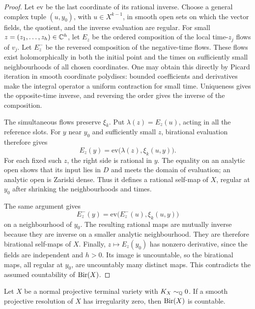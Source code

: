 \begin{proof}
Let \(\mathrm{ev}\) be the last coordinate of its rational inverse.
Choose a general complex tuple \((u,y_0)\), with
\(u\in X^{k-1}\), in smooth open sets on which the vector fields,
the quotient, and the inverse evaluation are regular.  For small
\(z=(z_1,\ldots,z_h)\in\mathbb C^h\), let \(E_z\) be the ordered
composition of the local time-\(z_j\) flows of \(v_j\).  Let
\(E_z^-\) be the reversed composition of the negative-time flows.
These flows exist holomorphically in both the initial point and the
times on sufficiently small neighbourhoods of all chosen coordinates.
One may obtain this directly by Picard iteration in smooth coordinate
polydiscs: bounded coefficients and derivatives make the integral
operator a uniform contraction for small time.  Uniqueness gives the
opposite-time inverse, and reversing the order gives the inverse of
the composition.

The simultaneous flows preserve \(\xi_k\).  Put
\(\lambda(z)=E_z(u)\), acting in all the reference slots.  For
\(y\) near \(y_0\) and sufficiently small \(z\), birational
evaluation therefore gives
\begin{equation}\label{eq:transport-flow-evaluation}
 E_z(y)=\mathrm{ev}\bigl(\lambda(z),\xi_k(u,y)\bigr).
\end{equation}
For each fixed such \(z\), the right side is rational in \(y\).
The equality on an analytic open shows that its input lies in \(D\)
and meets the domain of evaluation; an analytic open is Zariski dense.
Thus it defines a rational self-map of \(X\), regular at \(y_0\)
after shrinking the neighbourhoods and times.

The same argument gives
\[
 E_z^-(y)=\mathrm{ev}\bigl(E_z^-(u),\xi_k(u,y)\bigr)
\]
on a neighbourhood of \(y_0\).  The resulting rational maps are mutually inverse
because they are inverse on a smaller analytic neighbourhood.  They
are therefore birational self-maps of \(X\).  Finally,
\(z\mapsto E_z(y_0)\) has nonzero derivative, since the fields are
independent and \(h>0\).  Its image is uncountable, so the birational
maps, all regular at \(y_0\), are uncountably many distinct maps.
This contradicts the assumed countability of \(\operatorname{Bir}(X)\).
\end{proof}

\begin{lemma}\label{lem:birational-countability}
Let \(X\) be a normal projective terminal variety with
\(K_X\sim_\mathbb Q0\).  If a smooth projective resolution of \(X\) has
irregularity zero, then \(\operatorname{Bir}(X)\) is countable.
\end{lemma}

